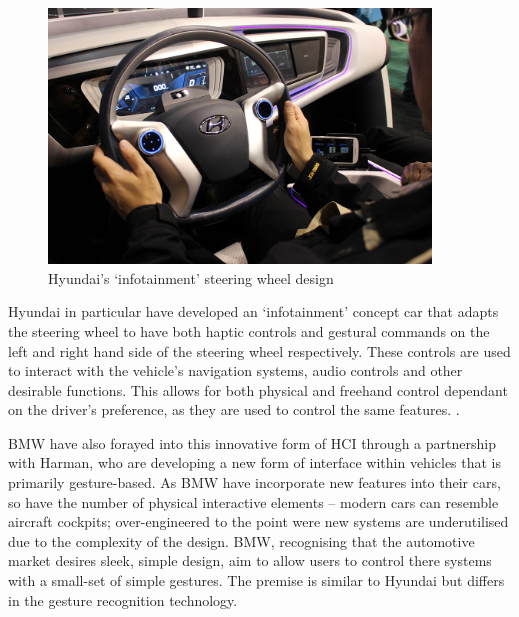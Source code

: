 \documentclass{l4proj}
\begin{document}
\begin{figure}[h!]
\centering
\includegraphics[width=4in]{images/hyundai.jpg}
\caption{Hyundai's `infotainment' steering wheel design}
\label{fig:hyundai}
\end{figure}

Hyundai\cite{} in particular have developed an `infotainment' concept car that adapts the steering wheel to have both haptic controls and gestural commands on the left and right hand side of the steering wheel respectively. These controls are used to interact with the vehicle's navigation systems, audio controls and other desirable functions. This allows for both physical and freehand control dependant on the driver's preference, as they are used to control the same features. \cite{}.

BMW have also forayed into this innovative form of HCI through a partnership with Harman, who are developing a new form of interface within vehicles that is primarily gesture-based\cite{}. As BMW have incorporate new features into their cars, so have the number of physical interactive elements -- modern cars can resemble aircraft cockpits; over-engineered to the point were new systems are underutilised due to the complexity of the design. BMW, recognising that the automotive market desires sleek, simple design, aim to allow users to control there systems with a small-set of simple gestures. The premise is similar to Hyundai but differs in the gesture recognition technology.
\end{document}

